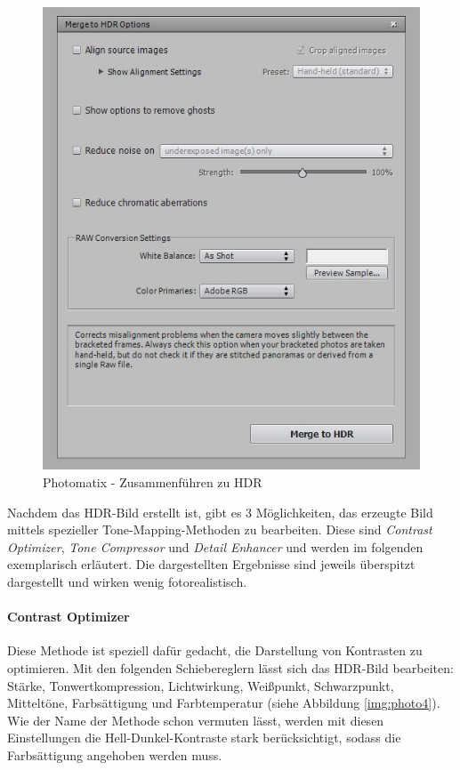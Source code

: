 \documentclass[liststotoc,bibtotoc,fontsize=14pt,]{scrreprt}
\begin{document}
		\bigskip
		\begin{figure}[H]
			\includegraphics[width=0.8\linewidth]{img/photo2.jpg}
			\caption{Photomatix - Zusammenführen zu HDR}
			\label{img:photo2}
		\end{figure}
	
		Nachdem das HDR-Bild erstellt ist, gibt es 3 Möglichkeiten, das erzeugte Bild mittels spezieller Tone-Mapping-Methoden zu bearbeiten. Diese sind \textit{Contrast Optimizer}, \textit{Tone Compressor} und \textit{Detail Enhancer} und werden im folgenden exemplarisch erläutert. Die dargestellten Ergebnisse sind jeweils überspitzt dargestellt und wirken wenig fotorealistisch.
		
		\bigskip
		\paragraph{Contrast Optimizer} Diese Methode ist speziell dafür gedacht, die Darstellung von Kontrasten zu optimieren. Mit den folgenden Schiebereglern lässt sich das HDR-Bild bearbeiten: Stärke, Tonwertkompression,	Lichtwirkung, Weißpunkt, Schwarzpunkt, Mitteltöne, Farbsättigung und Farbtemperatur (siehe Abbildung \ref{img:photo4}). Wie der Name der Methode schon vermuten lässt, werden mit diesen Einstellungen die Hell-Dunkel-Kontraste stark berücksichtigt, sodass die Farbsättigung angehoben werden muss.
		
\end{document}
